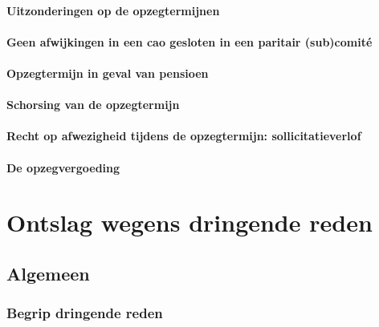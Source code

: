 \paragraph{Uitzonderingen op de opzegtermijnen}

\paragraph{Geen afwijkingen in een cao gesloten in een paritair (sub)comité}

\paragraph{Opzegtermijn in geval van pensioen}

\paragraph{Schorsing van de opzegtermijn}



\paragraph{Recht op afwezigheid tijdens de opzegtermijn: sollicitatieverlof}

\paragraph{De opzegvergoeding}



\section{Ontslag wegens dringende reden}

\subsection{Algemeen}

\subsubsection{Begrip dringende reden}

